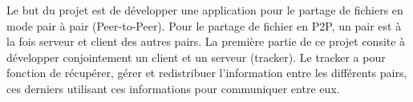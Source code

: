 Le but du projet est de développer une application pour le partage de fichiers en mode pair à pair (Peer-to-Peer). Pour le partage de fichier en P2P, un pair est à la fois serveur et client des autres pairs. La première partie de ce projet consite à développer conjointement un client et un serveur (tracker). Le tracker a pour fonction de récupérer, gérer et redistribuer l'information entre les différents pairs, ces derniers utilisant ces informations pour communiquer entre eux.
